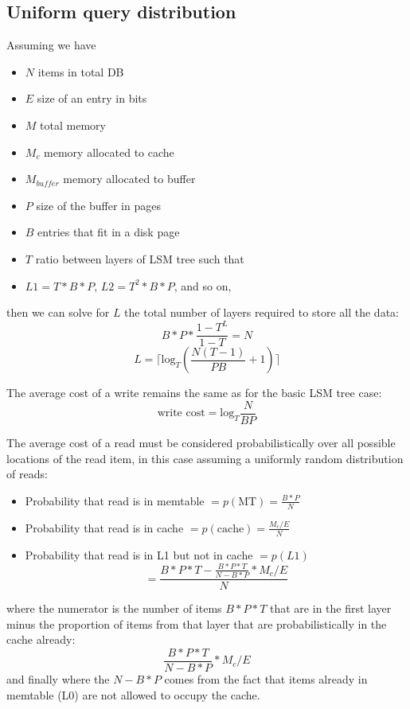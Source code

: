 \documentclass{sig-alternate-05-2015}
\begin{document}
\subsection{Uniform query distribution}

\noindent Assuming we have
\begin{itemize}
\item $N$ items in total DB \\
\item $E$ size of an entry in bits \\
\item $M$ total memory \\
\item $M_c$ memory allocated to cache \\
\item $M_{buffer}$ memory allocated to buffer\\
\item $P$ size of the buffer in pages \\
\item $B$ entries that fit in a disk page \\
\item $T$ ratio between layers of LSM tree such that \\
  \item $L1 = T * B* P$, $L2 =T^2 * B*P $, and so on,
\end{itemize}

\noindent then we can solve for $L$ the total number of layers required to store all the data: \\
$$B*P * \frac{1-T^L}{1-T} = N$$
$$L= \lceil \textrm{log}_{T} \left(\frac{N(T-1)}{PB} + 1\right) \rceil$$


The average cost of a write remains the same as for the basic LSM tree case:
$$
\text{write cost} = \textrm{log}_{T} \frac{N}{BP}
$$

The average cost of a read must be considered probabilistically over all possible locations of the read item, in this case assuming a uniformly random distribution of reads:
\begin{itemize}
\item Probability that read is in memtable $= p(\text{MT}) = \frac{B*P}{N}$
\item Probability that read is in cache $= p(\text{cache}) = \frac{M_c/E}{N}$
\item Probability that read is in L1 but not in cache $= p(L1)$ $$= \frac{B*P * T - \frac{B*P*T}{N-B*P} * M_c/E}{N}$$
\end{itemize}
where the numerator is the number of items $B*P*T$ that are in the first layer minus the proportion of items from that layer that are probabilistically in the cache already: $$\frac{B*P*T}{N-B*P} * M_c/E$$
and finally where the $N-B*P$ comes from the fact that items already in memtable (L0) are not allowed to occupy the cache.
\end{document}
